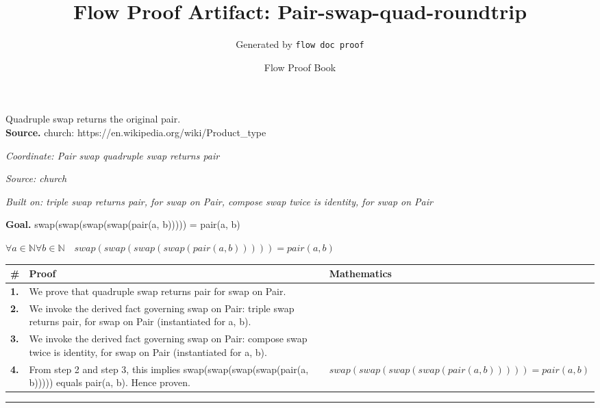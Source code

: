 \documentclass[11pt]{article}
\title{Flow Proof Artifact: Pair-swap-quad-roundtrip}
\author{Generated by \texttt{flow doc proof}}
\date{Flow Proof Book}
\theoremstyle{definition}
\begin{document}
\maketitle
Quadruple swap returns the original pair.\\[0.5em]
\textbf{Source.} church: https://en.wikipedia.org/wiki/Product\_type\\[0.5em]
\bigskip
{}\par
\smallskip\noindent\textit{Coordinate: Pair \cdot swap \cdot quadruple swap returns pair}\par
\smallskip\noindent\textit{Source: church}\par
\smallskip\noindent\textit{Built on: triple swap returns pair, for swap on Pair, compose swap twice is identity, for swap on Pair}\par
\medskip
\noindent\textbf{Goal.} swap(swap(swap(swap(pair(a, b))))) = pair(a, b)\par
\noindent$\displaystyle \forall a \in \mathbb{N} \forall b \in \mathbb{N}\quad swap(swap(swap(swap(pair(a, b))))) = pair(a, b)$\par
\medskip
\noindent
\begin{tabular}{@{} >{\raggedright\arraybackslash}p{} >{\raggedright\arraybackslash}p{} >{\raggedleft\arraybackslash}p{} @{}}
\textbf{\#} & \textbf{Proof} & \textbf{Mathematics} \\
\midrule
\textbf{1.} & We prove that quadruple swap returns pair for swap on Pair. & \\[0.45em]
\textbf{2.} & We invoke the derived fact governing swap on Pair: triple swap returns pair, for swap on Pair (instantiated for a, b). & \\[0.45em]
\textbf{3.} & We invoke the derived fact governing swap on Pair: compose swap twice is identity, for swap on Pair (instantiated for a, b). & \\[0.45em]
\textbf{4.} & From step 2 and step 3, this implies swap(swap(swap(swap(pair(a, b))))) equals pair(a, b). Hence proven. & $\displaystyle swap(swap(swap(swap(pair(a, b))))) = pair(a, b)$ \\[0.45em]
\bottomrule
\end{tabular}
\label{thm:Pair-swap-quadruple_swap_returns_pair}
\par\medskip\hrule
\end{document}
